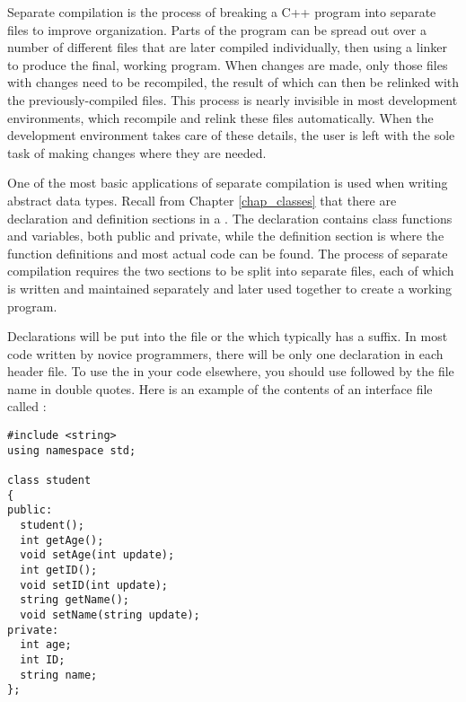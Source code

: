 
Separate compilation is the process of breaking a C++ program into separate files to improve organization. 
Parts of the program can be spread out over a number of different files that are later compiled individually, then  using a linker to produce the final, working program. 
When changes are made, only those files with changes need to be recompiled, the result of which can then be relinked with the previously-compiled files. 
This process is nearly invisible in most development environments, which recompile and relink these files automatically.
When the development environment takes care of these details, the user is left with the sole task of making changes where they are needed. 

One of the most basic applications of separate compilation is used when writing abstract data types. 
Recall from Chapter \ref{chap_classes} that there are declaration and definition sections in a . 
The declaration contains class functions and variables, both public and private, while the definition section is where the function definitions and most actual code can be found. 
The process of separate compilation requires the two sections to be split into separate files, each of which is written and maintained separately and later used together to create a working program. 

Declarations will be put into the  file or the  which typically has a  suffix.
In most code written by novice programmers, there will be only one  declaration in each header file. 
To use the  in your code elsewhere, you should use  followed by the file name in double quotes. 
Here is an example of the contents of an interface file called :

\noindent\begin{minipage}{\linewidth}\begin{lstlisting}
#include <string>
using namespace std;

class student
{
public:
  student();
  int getAge();
  void setAge(int update);
  int getID();
  void setID(int update);
  string getName();
  void setName(string update);
private:
  int age;
  int ID;
  string name;
};
\end{lstlisting}\end{minipage}

